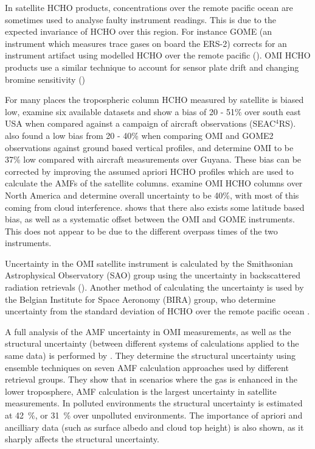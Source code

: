     In satellite HCHO products, concentrations over the remote pacific ocean are sometimes used to analyse faulty instrument readings.
    This is due to the expected invariance of HCHO over this region.
    For instance GOME (an instrument which measures trace gases on board the ERS-2) corrects for an instrument artifact using modelled HCHO over the remote pacific (\cite{Shim2005}).
    OMI HCHO products use a similar technique to account for sensor plate drift and changing bromine sensitivity (\cite{Abad2015})
    
    
    For many places the tropospheric column HCHO measured by satellite is biased low, \cite{Zhu2016} examine six available datasets and show a bias of 20 - 51\% over south east USA when compared against a campaign of aircraft observations (SEAC$^4$RS).
    \cite{DeSmedt2015} also found a low bias from 20 - 40\% when comparing OMI and GOME2 observations against ground based vertical profiles, and \cite{Barkley2013} determine OMI to be 37\% low compared with aircraft measurements over Guyana.
    These bias can be corrected by improving the assumed apriori HCHO profiles which are used to calculate the AMFs of the satellite columns.
    \cite{Millet2006} examine OMI HCHO columns over North America and determine overall uncertainty to be 40\%, with most of this coming from cloud interference.
    \cite{Millet2008} shows that there also exists some latitude based bias, as well as a systematic offset between the OMI and GOME instruments.
    This does not appear to be due to the different overpass times of the two instruments.
    
    Uncertainty in the OMI satellite instrument is calculated by the Smithsonian Astrophysical Observatory (SAO) group using the uncertainty in backscattered radiation retrievals (\cite{Abad2015, Abad2016}).
    Another method of calculating the uncertainty is used by the Belgian Institute for Space Aeronomy (BIRA) group, who determine uncertainty from the standard deviation of HCHO over the remote pacific ocean \citep{DeSmedt2012, DeSmedt2015}.
    
    A full analysis of the AMF uncertainty in OMI measurements, as well as the structural uncertainty (between different systems of calculations applied to the same data) is performed by \cite{Lorente2017}.
    They determine the structural uncertainty using ensemble techniques on seven AMF calculation approaches used by different retrieval groups.
    They show that in scenarios where the gas is enhanced in the lower troposphere, AMF calculation is the largest uncertainty in satellite measurements.
    In polluted environments the structural uncertainty is estimated at 42~\%, or 31~\% over unpolluted environments.
    The importance of apriori and ancilliary data (such as surface albedo and cloud top height) is also shown, as it sharply affects the structural uncertainty.
    

